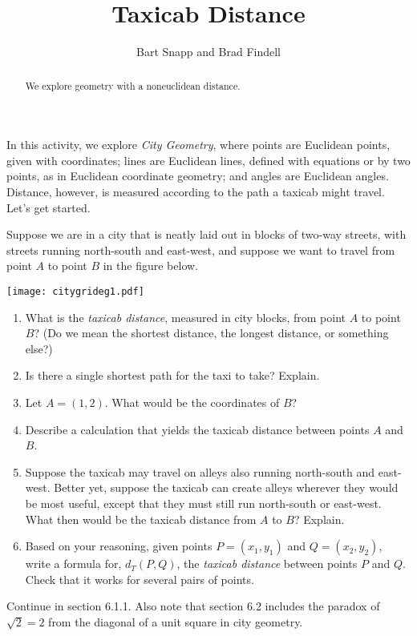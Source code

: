 \documentclass[nooutcomes]{ximera}
\title{Taxicab Distance}
\author{Bart Snapp and Brad Findell}
\begin{document}
\begin{abstract}
  We explore geometry with a noneuclidean distance.
\end{abstract}
\maketitle

In this activity, we explore \emph{City Geometry}, where points are Euclidean points, given with coordinates; lines are Euclidean lines, defined with equations or by two points, as in Euclidean coordinate geometry; and angles are Euclidean angles.  Distance, however, is measured according to the path a taxicab might travel.  Let's get started.  
\begin{problem}
Suppose we are in a city that is neatly laid out in blocks of two-way streets, with streets running north-south and east-west, and suppose we want to travel from point $A$ to point $B$ in the figure below.  
\begin{image}
\texttt{[image: citygrideg1.pdf]}
\end{image}
\begin{enumerate}
\item What is the \emph{taxicab distance}, measured in city blocks, from point $A$ to point $B$?  (Do we mean the shortest distance, the longest distance, or something else?)  
\item Is there a single shortest path for the taxi to take?  Explain.  
\item Let $A = (1,2)$. What would be the coordinates of $B$?  
\item Describe a calculation that yields the taxicab distance between points $A$ and $B$.  
\item Suppose the taxicab may travel on alleys also running north-south and east-west.  Better yet, suppose the taxicab can create alleys wherever they would be most useful, except that they must still run north-south or east-west.  What then would be the taxicab distance from $A$ to $B$?  Explain.  
\item Based on your reasoning, given points $P = (x_1, y_1)$ and $Q= (x_2, y_2)$, write a formula for, $d_T(P,Q)$, the \emph{taxicab distance} between points $P$ and $Q$.  Check that it works for several pairs of points.  
\end{enumerate}
\end{problem}

\begin{teachingnote}
Continue in section 6.1.1. Also note that section 6.2 includes the paradox of $\sqrt{2}=2$ from the diagonal of a unit square in city geometry.
\end{teachingnote}
  
\end{document}
